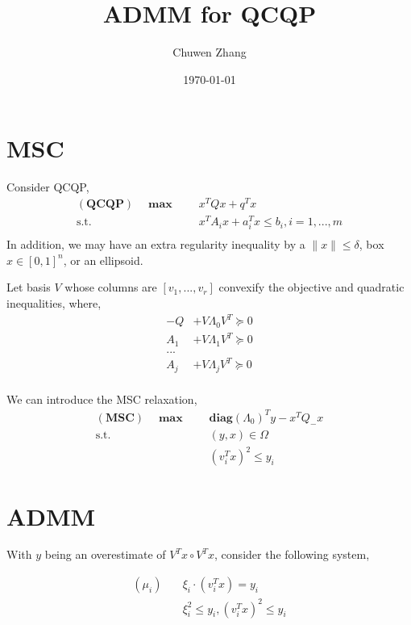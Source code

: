\documentclass[a4paper, 10pt]{article}
\title{ADMM for QCQP}
\author{Chuwen Zhang}
\date{\today}
\newcommand{\diag}{\mathbf{diag}}
\newcommand{\model}[1]{(\textbf{#1})}
\newcommand{\mx}{\mathbf{\max}\;}
\begin{document}
\maketitle
\section{MSC}

Consider QCQP,
\begin{equation}
    \label{eq:inhoqcqp}
    \begin{aligned}
        \model{QCQP} \quad \mx \quad & x^T Qx + q^T x                           \\
        \textrm{s.t.} \quad          & x^T A_i x + a_i^T x \le b_i, i=1, ..., m \\
    \end{aligned}
\end{equation}
In addition, we may have an extra regularity inequality by a \(\|x\| \le \delta\), box \(x \in [0, 1]^n\), or an ellipsoid.


Let basis \(V\) whose columns are \([v_1, ..., v_r]\) convexify the objective and quadratic inequalities, where,
\begin{align*}
    - Q & +  V\Lambda_0 V^T \succeq 0 \\
    A_1 & +  V\Lambda_1 V^T \succeq 0 \\
    ...                               \\
    A_j & +  V\Lambda_j V^T \succeq 0 \\
\end{align*}

We can introduce the MSC relaxation,
\begin{align}
    \model{MSC} \quad \mx \quad & \diag(\Lambda_0)^Ty - x^TQ_-x \\
    \mathrm{s.t.} \quad         & (y, x) \in \Omega             \\
                                & (v_i^Tx)^2 \le y_i
\end{align}


\section{ADMM}

With \(y\) being an overestimate of \(V^Tx \circ V^Tx\), consider the following system,

\begin{align*}
    ( \mu_i)    \quad & \xi_i \cdot (v_i^Tx) = y_i           \\
                      & \xi_i^2 \le y_i,  (v_i^Tx)^2 \le y_i
\end{align*}
\end{document}
